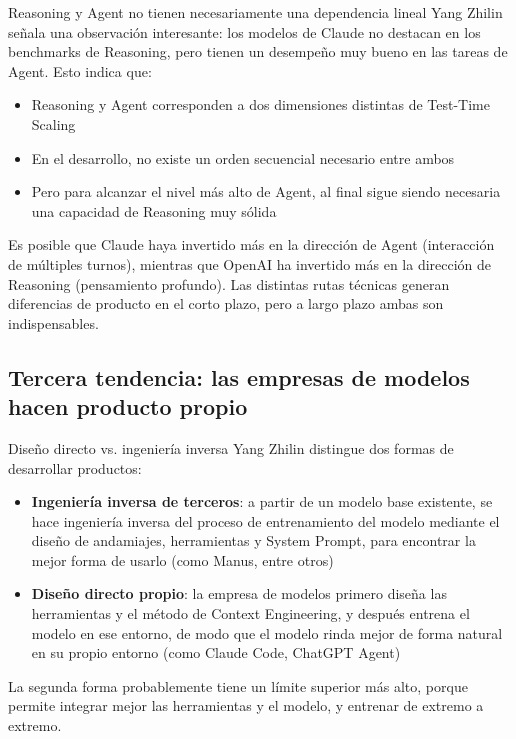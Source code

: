\documentclass[a4paper]{article}
\begin{document}
\begin{knowledgebox}{Reasoning y Agent no tienen necesariamente una dependencia lineal}
Yang Zhilin señala una observación interesante: los modelos de Claude no destacan en los benchmarks de Reasoning, pero tienen un desempeño muy bueno en las tareas de Agent. Esto indica que:
\begin{itemize}
    \item Reasoning y Agent corresponden a dos dimensiones distintas de Test-Time Scaling
    \item En el desarrollo, no existe un orden secuencial necesario entre ambos
    \item Pero para alcanzar el nivel más alto de Agent, al final sigue siendo necesaria una capacidad de Reasoning muy sólida
\end{itemize}
Es posible que Claude haya invertido más en la dirección de Agent (interacción de múltiples turnos), mientras que OpenAI ha invertido más en la dirección de Reasoning (pensamiento profundo). Las distintas rutas técnicas generan diferencias de producto en el corto plazo, pero a largo plazo ambas son indispensables.
\end{knowledgebox}

\subsection{Tercera tendencia: las empresas de modelos hacen producto propio}

\begin{importantbox}{Diseño directo vs. ingeniería inversa}
Yang Zhilin distingue dos formas de desarrollar productos:
\begin{itemize}
    \item \textbf{Ingeniería inversa de terceros}: a partir de un modelo base existente, se hace ingeniería inversa del proceso de entrenamiento del modelo mediante el diseño de andamiajes, herramientas y System Prompt, para encontrar la mejor forma de usarlo (como Manus, entre otros)
    \item \textbf{Diseño directo propio}: la empresa de modelos primero diseña las herramientas y el método de Context Engineering, y después entrena el modelo en ese entorno, de modo que el modelo rinda mejor de forma natural en su propio entorno (como Claude Code, ChatGPT Agent)
\end{itemize}
La segunda forma probablemente tiene un límite superior más alto, porque permite integrar mejor las herramientas y el modelo, y entrenar de extremo a extremo.
\end{importantbox}
\end{document}
